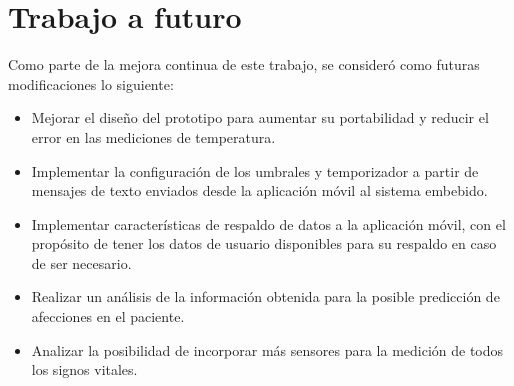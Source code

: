 
\section{Trabajo a futuro}

Como parte de la mejora continua de este trabajo, se consideró como futuras modificaciones lo siguiente:

\begin{itemize}
	\item Mejorar el diseño del prototipo para aumentar su portabilidad y reducir el error en las mediciones de temperatura.
	
	\item Implementar la configuración de los umbrales y temporizador a partir de mensajes de texto enviados desde la aplicación móvil al sistema embebido. 
	
	\item Implementar características de respaldo de datos a la aplicación móvil, con el propósito de tener los datos de usuario disponibles para su respaldo en caso de ser necesario.
	
	\item Realizar un análisis de la información obtenida para la posible predicción de afecciones en el paciente. 
	
	\item Analizar la posibilidad de incorporar más sensores para la medición de todos los signos vitales.
	
\end{itemize}